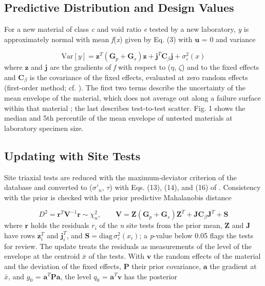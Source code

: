 \documentclass[Journal,letterpaper]{ascelike-new}
\begin{document}
\subsection{Predictive Distribution and Design Values}
For a new material of class \textit{c} and void ratio \textit{e} tested by a new laboratory, \textit{y} is approximately normal with mean \textit{f}(\textit{x}) given by Eq. (3) with $\mathbf{u}$ = 0 and variance

\begin{equation}
\mathrm{Var}[y]=\mathbf{z}^T(\mathbf{G}_p+\mathbf{G}_s)\mathbf{z}+\mathbf{j}^T\mathbf{C}_\beta\mathbf{j}+\sigma_\varepsilon^2(x)
\end{equation}
\noindent where $\mathbf{z}$ and $\mathbf{j}$ are the gradients of \textit{f} with respect to ($\eta$, $\zeta$) and to the fixed effects and $\mathbf{C}_\beta$ is the covariance of the fixed effects, evaluated at zero random effects (first-order method; cf. ). The first two terms describe the uncertainty of the mean envelope of the material, which does not average out along a failure surface within that material \cite{christian1994}; the last describes test-to-test scatter. Fig. 1 shows the median and 5th percentile of the mean envelope of untested materials at laboratory specimen size.

\subsection{Updating with Site Tests}
Site triaxial tests are reduced with the maximum-deviator criterion of the database and converted to ($\sigma'_n$, $\tau$) with Eqs. (13), (14), and (16) of . Consistency with the prior is checked with the prior predictive Mahalanobis distance

\begin{equation}
D^2=\mathbf{r}^T\mathbf{V}^{-1}\mathbf{r}\sim\chi^2_n,\qquad \mathbf{V}=\mathbf{Z}(\mathbf{G}_p+\mathbf{G}_s)\mathbf{Z}^T+\mathbf{J}\mathbf{C}_\beta\mathbf{J}^T+\mathbf{S}
\end{equation}
\noindent where $\mathbf{r}$ holds the residuals $r_i$ of the \textit{n} site tests from the prior mean, $\mathbf{Z}$ and $\mathbf{J}$ have rows $\mathbf{z}_i^T$ and $\mathbf{j}_i^T$, and $\mathbf{S}=\mathrm{diag}\,\sigma_\varepsilon^2(x_i)$; a \textit{p}-value below 0.05 flags the tests for review. The update treats the residuals as measurements of the level of the envelope at the centroid $\bar{x}$ of the tests. With $\mathbf{v}$ the random effects of the material and the deviation of the fixed effects, $\mathbf{P}$ their prior covariance, $\mathbf{a}$ the gradient at $\bar{x}$, and $g_0$ = $\mathbf{a}^T\mathbf{P}\mathbf{a}$, the level $q_0$ = $\mathbf{a}^T\mathbf{v}$ has the posterior
\end{document}
